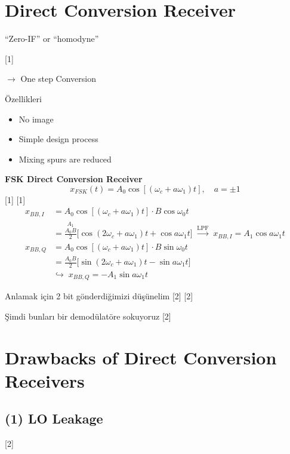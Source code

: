 \documentclass[11pt,a4paper]{article}
\begin{document}

\section{Direct Conversion Receiver}
``Zero-IF'' or ``homodyne''

[1]

$\rightarrow$ One step Conversion

Özellikleri
\begin{itemize}[label=$\checkmark$]
\item No image
\item Simple design process
\item Mixing spurs are reduced
\end{itemize}

\begin{ornek}
\textbf{FSK Direct Conversion Receiver}
\[ x_{FSK}(t) = A_0\cos[(\omega_c + a\omega_1)t],\quad a = \pm 1 \]
[1]
[1]
\begin{align*}
x_{BB,I} &= A_0\cos[(\omega_c + a\omega_1)t]\cdot B\cos\omega_0 t\\
&= \overset{\scriptstyle A_1}{\frac{A_0 B}{2}}\bigl[\cos(2\omega_c + a\omega_1)t + \cos a\omega_1 t\bigr] \;\xrightarrow{\text{LPF}}\; x_{BB,I} = A_1\cos a\omega_1 t\\
x_{BB,Q} &= A_0\cos[(\omega_c + a\omega_1)t]\cdot B\sin\omega_0 t\\
&= \frac{A_0 B}{2}\bigl[\sin(2\omega_c + a\omega_1)t - \sin a\omega_1 t\bigr]\\
&\hookrightarrow\; x_{BB,Q} = -A_1\sin a\omega_1 t
\end{align*}
\end{ornek}

Anlamak için 2 bit gönderdiğimizi düşünelim
[2]
[2]

Şimdi bunları bir demodülatöre sokuyoruz
[2]

\section{Drawbacks of Direct Conversion Receivers}
\subsection{(1) LO Leakage}
[2]
\end{document}

